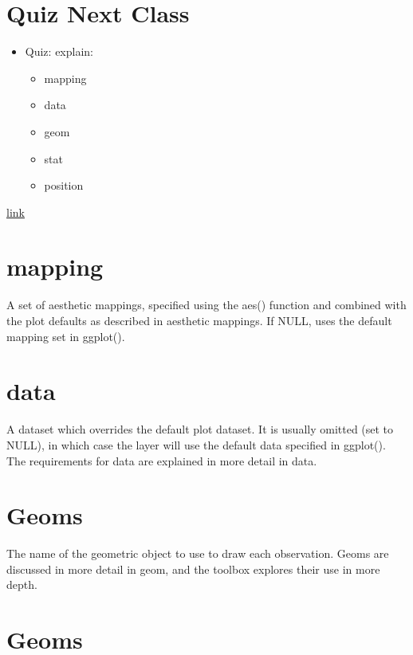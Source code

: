 \documentclass[
]{book}
\providecommand{\tightlist}{%
  \setlength{\itemsep}{0pt}\setlength{\parskip}{0pt}}
\theoremstyle{definition}
\theoremstyle{definition}
\theoremstyle{definition}
\theoremstyle{definition}
\theoremstyle{remark}
\begin{document}
\hypertarget{quiz-next-class}{%
\section{Quiz Next Class}\label{quiz-next-class}}

\begin{itemize}
\tightlist
\item
  Quiz: explain:

  \begin{itemize}
  \tightlist
  \item
    mapping
  \item
    data
  \item
    geom
  \item
    stat
  \item
    position
  \end{itemize}
\end{itemize}

\href{https://rpubs.com/hadley/ggplot2-layers}{link}

\hypertarget{mapping}{%
\section{mapping}\label{mapping}}

A set of aesthetic mappings, specified using the aes() function and combined with the plot defaults as described in aesthetic mappings. If NULL, uses the default mapping set in ggplot().

\hypertarget{data}{%
\section{data}\label{data}}

A dataset which overrides the default plot dataset. It is usually omitted (set to NULL), in which case the layer will use the default data specified in ggplot(). The requirements for data are explained in more detail in data.

\hypertarget{geoms}{%
\section{Geoms}\label{geoms}}

The name of the geometric object to use to draw each observation. Geoms are discussed in more detail in geom, and the toolbox explores their use in more depth.

\hypertarget{geoms-1}{%
\section{Geoms}\label{geoms-1}}
\end{document}

